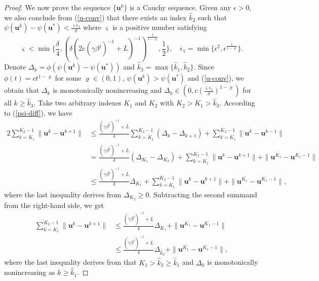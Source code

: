 \documentclass{article}
\numberwithin{equation}{section}
\begin{document}
\begin{proof}
We now prove the sequence $\{\mathbf{u}^k\}$ is a Cauchy sequence. Given any $\epsilon>0$, we also conclude from (\ref{u-conv}) that there exists an index $\hat{k}_2$ such that $\psi(\mathbf{u}^k)-\psi(\mathbf{u}^*)<\frac{\varsigma\epsilon_1}{\delta}$ where $\varsigma$ is a positive number satisfying
$$\varsigma<\min\{\frac{\delta}{4}, (\delta(2c(\gamma\beta^{\bar{j}})^{-1}+L)^{-1})^{\frac{1}{1-\varrho}}, \frac{1}{2}\}, \quad \epsilon_1=\min\{\epsilon^2, \epsilon^{\frac{1}{1-\varrho}}\}.$$
Denote $\Delta_k=\phi(\psi(\mathbf{u}^k)-\psi(\mathbf{u}^*))$ and $\hat{k}_3=\max\{\hat{k}_1, \hat{k}_2\}$. Since $\phi(t)=ct^{1-\varrho}$ for some $\varrho\in(0,1)$, $\psi(\mathbf{u}^k)>\psi(\mathbf{u}^*)$ and  (\ref{u-conv}), we obtain that $\Delta_k$ is monotonically nonincreasing and $\Delta_k\in(0, c(\frac{\varsigma\epsilon_1}{\delta})^{1-\varrho})$ for all $k\geq \hat{k}_3$.
Take two arbitrary indexes $K_1$ and $K_2$ with $K_2>K_1>\hat{k}_3$. According to (\ref{psi-diff}), we have
\begin{equation}
	\begin{aligned}
		2\sum_{k=K_1}^{K_2-1}\|\mathbf{u}^k-\mathbf{u}^{k+1}\|& \leq\frac{(\gamma\beta^{\bar{j}})^{-1}+L}{\delta}\sum_{k=K_1}^{K_2-1}(\Delta_k-\Delta_{k+1})+\sum_{k=K_1}^{K_2-1}\|\mathbf{u}^k-\mathbf{u}^{k-1}\|\\
&=\frac{(\gamma\beta^{\bar{j}})^{-1}+L}{\delta}(\Delta_{K_1}-\Delta_{K_2})+\sum_{k=K_1}^{K_2-1}\|\mathbf{u}^k-\mathbf{u}^{k+1}\|
		+\|\mathbf{u}^{K_1}-\mathbf{u}^{K_1-1}\|\\
		&\leq \frac{(\gamma\beta^{\bar{j}})^{-1}+L}{\delta}\Delta_{K_1}+\sum_{k=K_1}^{K_2-1}\|\mathbf{u}^k-\mathbf{u}^{k+1}\|
		+\|\mathbf{u}^{K_1}-\mathbf{u}^{K_1-1}\|,
	\end{aligned}\nonumber\end{equation}
where the last inequality derives from $\Delta_{K_2}\geq0$.
Subtracting the second summand from the right-hand side, we get
\begin{equation}
	\begin{aligned}
		\sum_{k=K_1}^{K_2-1}\|\mathbf{u}^k-\mathbf{u}^{k+1}\|
		&\leq\frac{(\gamma\beta^{\bar{j}})^{-1}+L}{\delta}\Delta_{K_1}
		+\|\mathbf{u}^{K_1}-\mathbf{u}^{K_1-1}\|\\
		&\leq\frac{(\gamma\beta^{\bar{j}})^{-1}+L}{\delta}\Delta_{\hat{k}_3}
		+\|\mathbf{u}^{K_1}-\mathbf{u}^{K_1-1}\|,
	\end{aligned}\nonumber\end{equation}
where the last inequality derives from that $K_1>\hat{k}_3\geq\hat{k}_1$ and $\Delta_{k}$ is monotonically nonincreasing as $k\geq\hat{k}_1$.

\end{proof}
\end{document}
